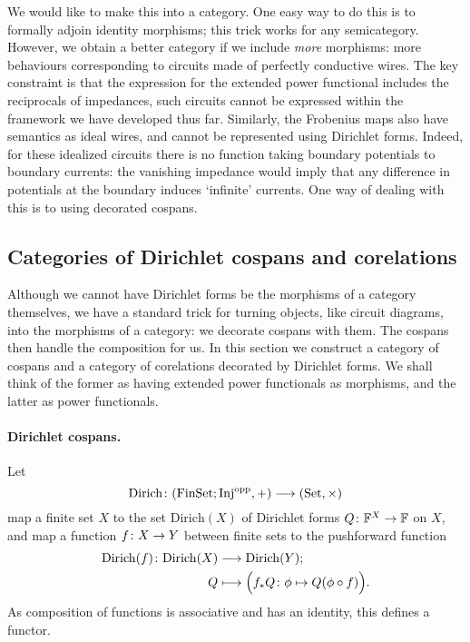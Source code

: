We would like to make this into a category. One easy way to do this is to
formally adjoin identity morphisms; this trick works for any semicategory.
However, we obtain a better category if we include \emph{more} morphisms: more
behaviours corresponding to circuits made of perfectly conductive wires.
The key constraint is that the expression for the extended power functional
includes the reciprocals of impedances, such circuits cannot be expressed within
the framework we have developed thus far. Similarly, the Frobenius maps also
have semantics as ideal wires, and cannot be represented using Dirichlet forms.
Indeed, for these idealized circuits there is no function taking boundary
potentials to boundary currents: the vanishing impedance would imply that any
difference in potentials at the boundary induces `infinite' currents. One way of
dealing with this is to using decorated cospans.


\subsection{Categories of Dirichlet cospans and corelations}

Although we cannot have Dirichlet forms be the morphisms of a category
themselves, we have a standard trick for turning objects, like circuit diagrams,
into the morphisms of a category: we decorate cospans with them. The cospans
then handle the composition for us. In this section we construct a category of
cospans and a category of corelations decorated by Dirichlet forms. We shall
think of the former as having extended power functionals as morphisms, and the
latter as power functionals.


\paragraph{Dirichlet cospans.}
Let
\[
  \mathrm{Dirich}{\colon} (\mathrm{FinSet};\mathrm{Inj}^{\mathrm{opp}},+) \longrightarrow (\mathrm{Set},\times)
\]
map a finite set $X$ to the set $\mathrm{Dirich}(X)$ of Dirichlet forms $Q{\colon}
{\mathbb F}^X \to {\mathbb F}$ on $X$, and map a function $f{\colon} X \to Y$ between finite sets to
the pushforward function
\begin{align*}
  \mathrm{Dirich}(f){\colon} \mathrm{Dirich}(X) &\longrightarrow \mathrm{Dirich}(Y); \\
  Q &\longmapsto \Big(f_{\ast}Q{\colon} \phi \mapsto Q(\phi\circ f)\Big).
\end{align*}
As composition of functions is associative and has an identity, this defines a
functor.

